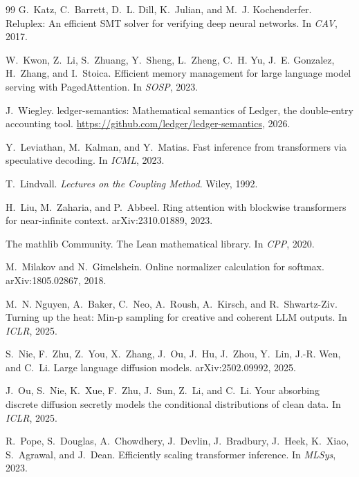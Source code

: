 \documentclass[10pt]{article}
\theoremstyle{qpt}
\begin{document}
\begin{thebibliography}{99}
G.~Katz, C.~Barrett, D.~L. Dill, K.~Julian, and M.~J. Kochenderfer.
\newblock Reluplex: An efficient {SMT} solver for verifying deep neural networks.
\newblock In \emph{CAV}, 2017.

W.~Kwon, Z.~Li, S.~Zhuang, Y.~Sheng, L.~Zheng, C.~H. Yu, J.~E. Gonzalez, H.~Zhang, and I.~Stoica.
\newblock Efficient memory management for large language model serving with {PagedAttention}.
\newblock In \emph{SOSP}, 2023.

J.~Wiegley.
\newblock ledger-semantics: Mathematical semantics of {Ledger}, the double-entry accounting tool.
\newblock \url{https://github.com/ledger/ledger-semantics}, 2026.

Y.~Leviathan, M.~Kalman, and Y.~Matias.
\newblock Fast inference from transformers via speculative decoding.
\newblock In \emph{ICML}, 2023.

T.~Lindvall.
\newblock \emph{Lectures on the Coupling Method}.
\newblock Wiley, 1992.

H.~Liu, M.~Zaharia, and P.~Abbeel.
\newblock Ring attention with blockwise transformers for near-infinite context.
\newblock arXiv:2310.01889, 2023.

The mathlib Community.
\newblock The {Lean} mathematical library.
\newblock In \emph{CPP}, 2020.

M.~Milakov and N.~Gimelshein.
\newblock Online normalizer calculation for softmax.
\newblock arXiv:1805.02867, 2018.

M.~N. Nguyen, A.~Baker, C.~Neo, A.~Roush, A.~Kirsch, and R.~Shwartz-Ziv.
\newblock Turning up the heat: Min-p sampling for creative and coherent {LLM} outputs.
\newblock In \emph{ICLR}, 2025.

S.~Nie, F.~Zhu, Z.~You, X.~Zhang, J.~Ou, J.~Hu, J.~Zhou, Y.~Lin, J.-R. Wen, and C.~Li.
\newblock Large language diffusion models.
\newblock arXiv:2502.09992, 2025.

J.~Ou, S.~Nie, K.~Xue, F.~Zhu, J.~Sun, Z.~Li, and C.~Li.
\newblock Your absorbing discrete diffusion secretly models the conditional distributions of clean data.
\newblock In \emph{ICLR}, 2025.

R.~Pope, S.~Douglas, A.~Chowdhery, J.~Devlin, J.~Bradbury, J.~Heek, K.~Xiao, S.~Agrawal, and J.~Dean.
\newblock Efficiently scaling transformer inference.
\newblock In \emph{MLSys}, 2023.


\end{thebibliography}
\end{document}
